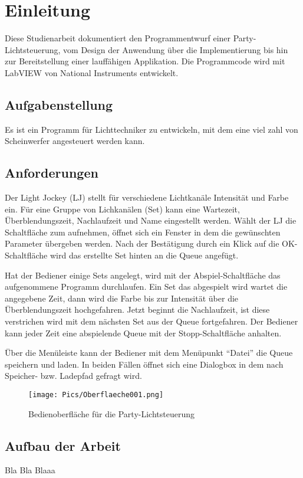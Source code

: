 \section{Einleitung}%

Diese Studienarbeit dokumentiert den Programmentwurf einer Party-Lichtsteuerung, vom Design der Anwendung über die Implementierung bis hin zur Bereitstellung einer lauffähigen Applikation.
Die Programmcode wird mit LabVIEW von National Instruments entwickelt.

\subsection{Aufgabenstellung}
Es ist ein Programm für Lichttechniker zu entwickeln, mit dem eine viel zahl von Scheinwerfer angesteuert werden kann. 

\subsection{Anforderungen}
Der Light Jockey (LJ) stellt für verschiedene Lichtkanäle Intensität und Farbe ein. Für eine Gruppe von Lichkanälen (Set) kann eine Wartezeit, Überblendungszeit, Nachlaufzeit und Name eingestellt werden. Wählt der LJ die Schaltfläche zum aufnehmen, öffnet sich ein Fenster in dem die gewünschten Parameter übergeben werden. Nach der Bestätigung durch ein Klick auf die OK-Schaltfläche wird das erstellte Set hinten an die Queue angefügt.

Hat der Bediener einige Sets angelegt, wird mit der Abspiel-Schaltfläche das aufgenommene Programm durchlaufen. Ein Set das abgespielt wird wartet die angegebene Zeit, dann wird die Farbe bis zur Intensität über die Überblendungszeit hochgefahren. Jetzt beginnt die Nachlaufzeit, ist diese verstrichen wird mit dem nächsten Set aus der Queue fortgefahren. Der Bediener kann jeder Zeit eine abspielende Queue mit der Stopp-Schaltfläche anhalten.

Über die Menüleiste kann der Bediener mit dem Menüpunkt "`Datei"' die Queue speichern und laden. In beiden Fällen öffnet sich eine Dialogbox in dem nach Speicher- bzw. Ladepfad gefragt wird.

	\begin{figure}%
	\centering
		\texttt{[image: Pics/Oberflaeche001.png]}
	\caption{Bedienoberfläche für die Party-Lichtsteuerung}
	\label{fig:ober001}
	\end{figure}






\subsection{Aufbau der Arbeit}

Bla Bla Blaaa




